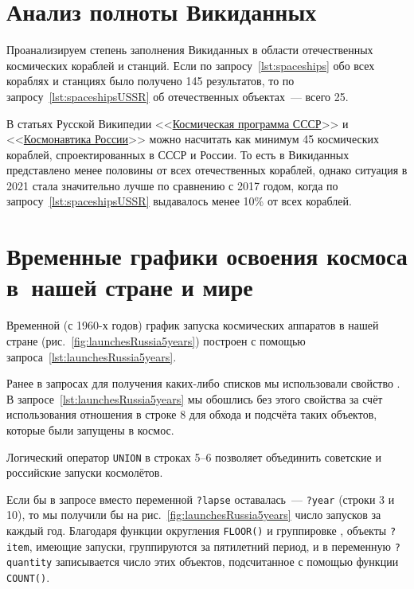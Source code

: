 \section{Анализ полноты Викиданных}

Проанализируем степень заполнения Викиданных в области отечественных космических кораблей и станций. 
Если по запросу~\ref{lst:spaceships} обо всех кораблях и станциях было получено 145 результатов, 
то по запросу~\ref{lst:spaceshipsUSSR} об отечественных объектах~--- всего 25. 

В статьях Русской Википедии <<\href{https://ru.wikipedia.org/?curid=1218094}{Космическая программа СССР}>> и <<\href{https://ru.wikipedia.org/?curid=6147222}{Космонавтика России}>> можно насчитать как минимум 45 космических кораблей, спроектированных в СССР и России. То есть в Викиданных представлено менее половины от всех отечественных кораблей, однако ситуация в 2021 стала значительно лучше по сравнению с 2017 годом, когда по запросу~\ref{lst:spaceshipsUSSR} выдавалось менее 10\% от всех кораблей. 


\section{Временные графики освоения космоса в~нашей стране и мире}

Временной (с 1960-х годов) 
график запуска космических аппаратов в нашей стране (рис.~\ref{fig:launchesRussia5years}) 
построен с помощью запроса~\ref{lst:launchesRussia5years}.%

Ранее в запросах для получения каких-либо списков мы использовали свойство . 
В запросе~\ref{lst:launchesRussia5years} мы обошлись без этого свойства за счёт использования отношения 
 в строке 8 
для обхода и подсчёта таких объектов, которые были запущены в космос.  

Логический оператор \lstinline|UNION| в строках 5--6 
позволяет объединить советские и российские запуски космолётов. 

Если бы в запросе вместо переменной \lstinline|?lapse| оставалась~--- \lstinline|?year| (строки 3 и 10), 
то мы получили бы на рис.~\ref{fig:launchesRussia5years} 
число запусков за каждый год. 
Благодаря функции округления \lstinline|FLOOR()| 
и группировке%
, 
объекты \lstinline|?item|, имеющие запуски, группируются за пятилетний период, 
и в переменную \lstinline|?quantity| записывается число этих объектов, 
подсчитанное с помощью функции \lstinline|COUNT()|.

